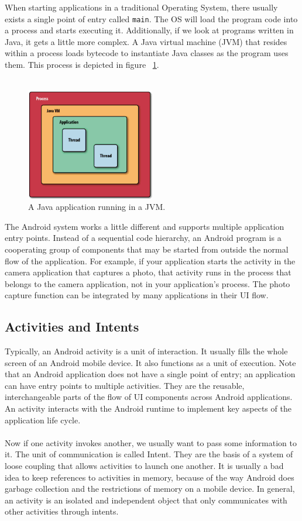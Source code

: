 When starting applications in a traditional Operating System, there usually exists a single point of entry called \texttt{main}. The OS will load the program code into a process and starts executing it. Additionally, if we look at programs written in Java, it gets a little more complex. A Java virtual machine (JVM) that resides within a process loads bytecode to instantiate Java classes as the program uses them. This process is depicted in figure ~\ref{fig:java_app}.
\\ \\
\begin{figure}[h!]
\centering
\includegraphics[width=0.5\textwidth]{images/chap4_java_app.png}
\caption{A Java application running in a JVM.}
\label{fig:java_app}
\end{figure}
The Android system works a little different and supports multiple application entry points. Instead of a sequential code hierarchy, an Android program is a cooperating group of components that may be started from outside the normal flow of the application. For example, if your application starts the activity in the camera application that captures a photo, that activity runs in the process that belongs to the camera application, not in your application's process. The photo capture function can be integrated by many applications in their UI flow.

\subsection{Activities and Intents}

Typically, an Android activity is a unit of interaction. It usually fills the whole screen of an Android mobile device. It also functions as a unit of execution. Note that an Android application does not have a single point of entry; an application can have entry points to multiple activities. They are the reusable, interchangeable parts of the flow of UI components across Android applications. An activity interacts with the Android runtime to implement key aspects of the application life cycle.
\\ \\
Now if one activity invokes another, we usually want to pass some information to it. The unit of communication is called Intent. They are the basis of a system of loose coupling that allows activities to launch one another. It is usually a bad idea to keep references to activities in memory, because of the way Android does garbage collection and the restrictions of memory on a mobile device. In general, an activity is an isolated and independent object that only communicates with other activities through intents.

